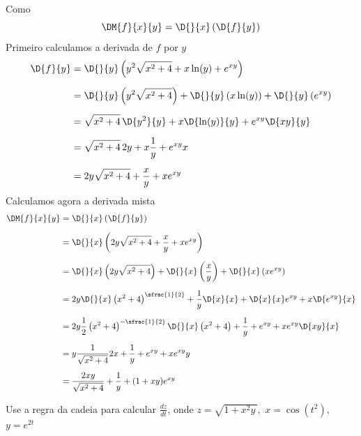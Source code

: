 \documentclass[a4paper,12pt,fleqn]{article}
\begin{document}
\begin{answer}
  Como
  \[
    \DM{f}{x}{y} = \D{}{x} \left(\D{f}{y}\right)
  \]
  Primeiro calculamos a derivada de $f$ por $y$
  \begin{align*}
    \D{f}{y}
    & = \D{}{y} \left( y^2\sqrt{x^2+4} + x\ln(y) + e^{xy} \right)
    \\[2mm]
    & = \D{}{y} \left( y^2\sqrt{x^2+4} \right)
      + \D{}{y} \left( x\ln(y) \right)
      + \D{}{y} \left( e^{xy} \right)
    \\[2mm]
    & = \sqrt{x^2+4} \, \D{y^2}{y}
      + x \D{\ln(y)}{y}
      + e^{xy} \D{xy}{y}
    \\[2mm]
    & = \sqrt{x^2+4}\, 2y
      + x \frac{1}{y}
      + e^{xy} x
    \\[2mm]
    & = 2y \sqrt{x^2+4} + \frac{x}{y} + x e^{xy}
  \end{align*}
  Calculamos agora a derivada mista
  \begin{align*}
    \DM{f}{x}{y}
    & = \D{}{x} \left(\D{f}{y}\right)
    \\[2mm]
    & = \D{}{x} \left( 2y \sqrt{x^2+4} + \frac{x}{y} + x e^{xy}\right)
    \\[2mm]
    & = \D{}{x} \left( 2y \sqrt{x^2+4} \right)
      + \D{}{x} \left( \frac{x}{y}\right)
      + \D{}{x} \left( x e^{xy}\right)
    \\[2mm]
    & = 2y \D{}{x} \left(x^2+4\right)^{\sfrac{1}{2}}
      + \frac{1}{y}\D{x}{x}
      + \D{x}{x} e^{xy}
      + x \D{e^{xy}}{x}
    \\[2mm]
    & = 2y \frac{1}{2} \left(x^2+4\right)^{-\sfrac{1}{2}}
           \D{}{x} \left(x^2+4\right)
      + \frac{1}{y}
      + e^{xy}
      + x e^{xy} \D{xy}{x}
    \\[2mm]
    & = y \frac{1}{\sqrt{x^2+4}} 2x
      + \frac{1}{y}
      + e^{xy}
      + x e^{xy} y
    \\[2mm]
    & = \frac{2xy}{\sqrt{x^2+4}} + \frac{1}{y} + (1+xy)e^{xy}
  \end{align*}
\end{answer}

Use a regra da cadeia para calcular $\frac{dz}{dt}$, onde
\(
  z = \sqrt{1 + x^2 y\,},
\)
\(
  x = \cos\left(t^2\right),
\)
\(
  y = e^{2t}
\)
\end{document}
